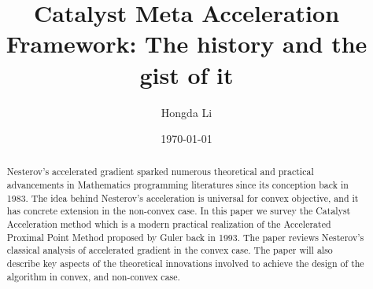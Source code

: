 \documentclass[12pt]{article}
\begin{document}
\title{
    {
        \selectfont 
        Catalyst Meta Acceleration Framework: The history and the gist of it
    }
    }

\author{
    Hongda Li
}

\date{\today}

\maketitle


\begin{abstract} 
    \noindent
    Nesterov's accelerated gradient sparked numerous theoretical and practical advancements in Mathematics programming literatures since its conception back in 1983. 
    The idea behind Nesterov's acceleration is universal for convex objective, and it has concrete extension in the non-convex case. 
    In this paper we survey the Catalyst Acceleration method which is a modern practical realization of the Accelerated Proximal Point Method proposed by Guler back in 1993. 
    The paper reviews Nesterov's classical analysis of accelerated gradient in the convex case.
    The paper will also describe key aspects of the theoretical innovations involved to achieve the design of the algorithm in convex, and non-convex case. 
    
\end{abstract}

\end{document}
